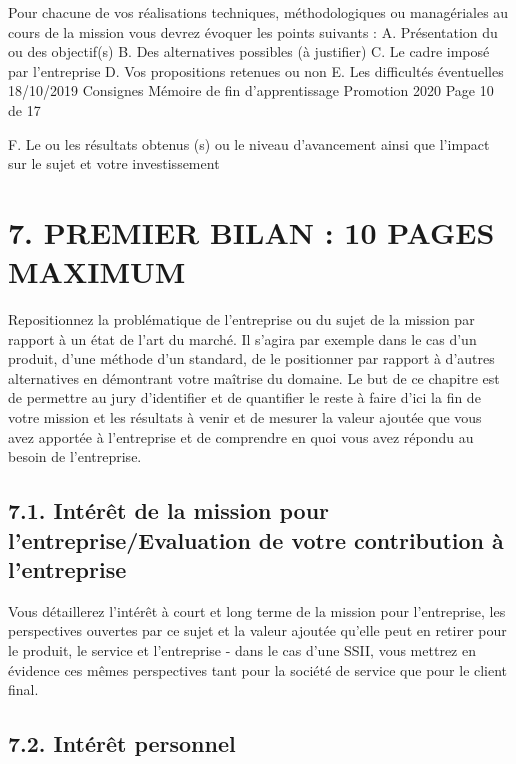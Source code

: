 \documentclass[a4paper, 12pt]{article}
\begin{document}
Pour chacune de vos réalisations techniques, méthodologiques ou managériales au cours de la mission
vous devrez évoquer les points suivants :
A. Présentation du ou des objectif(s)
B. Des alternatives possibles (à justifier)
C. Le cadre imposé par l’entreprise
D. Vos propositions retenues ou non
E. Les difficultés éventuelles
18/10/2019 Consignes Mémoire de fin d'apprentissage Promotion 2020 Page 10 de 17

F. Le ou les résultats obtenus (s) ou le niveau d’avancement ainsi que l’impact sur le sujet et votre
investissement

    
    \newpage{}
    
\newpage{}
\section{7. PREMIER BILAN : 10 PAGES MAXIMUM}

Repositionnez la problématique de l’entreprise ou du sujet de la mission par rapport à un état de
l’art du marché. Il s’agira par exemple dans le cas d’un produit, d’une méthode d’un standard, de le
positionner par rapport à d’autres alternatives en démontrant votre maîtrise du domaine.
Le but de ce chapitre est de permettre au jury d’identifier et de quantifier le reste à faire d’ici la fin de
votre mission et les résultats à venir et de mesurer la valeur ajoutée que vous avez apportée à
l’entreprise et de comprendre en quoi vous avez répondu au besoin de l’entreprise.

\subsection{7.1. Intérêt de la mission pour l'entreprise/Evaluation de votre contribution à l’entreprise}

Vous détaillerez l’intérêt à court et long terme de la mission pour l’entreprise, les
perspectives ouvertes par ce sujet et la valeur ajoutée qu’elle peut en retirer pour le produit,
le service et l’entreprise - dans le cas d’une SSII, vous mettrez en évidence ces mêmes
perspectives tant pour la société de service que pour le client final.

    
    \newpage{}
    
\subsection{7.2. Intérêt personnel}
\end{document}

